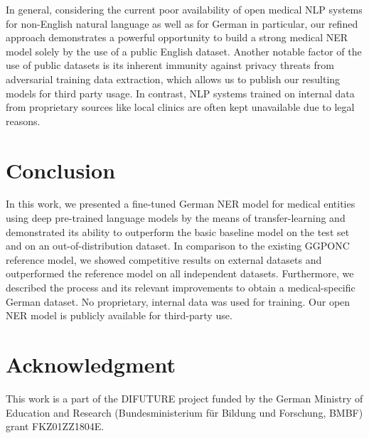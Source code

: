 \documentclass[runningheads]{llncs}
\begin{document}
In general, considering the current poor availability of open medical NLP systems for non-English natural language as well as for German in particular, our refined approach demonstrates a powerful opportunity to build a strong medical NER model solely by the use of a public English dataset. Another notable factor of the use of public datasets is its inherent immunity against privacy threats from adversarial training data extraction, which allows us to publish our resulting models for third party usage. In contrast, NLP systems trained on internal data from proprietary sources like local clinics are often kept unavailable due to legal reasons.

\section{Conclusion}
In this work, we presented a fine-tuned German NER model for medical entities using deep pre-trained language models by the means of transfer-learning and demonstrated its ability to outperform the basic baseline model on the test set and on an out-of-distribution dataset. In comparison to the existing GGPONC reference model, we showed competitive results on external datasets and outperformed the reference model on all independent datasets. Furthermore, we described the process and its relevant improvements to obtain a medical-specific German dataset. No proprietary, internal data was used for training. Our open NER model is publicly available for third-party use.

\section*{Acknowledgment}
This work is a part of the DIFUTURE project funded by the German Ministry of Education and Research (Bundesministerium für Bildung und Forschung, BMBF) grant FKZ01ZZ1804E.
\end{document}
